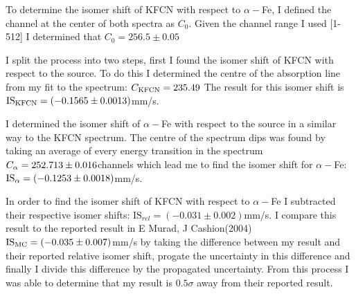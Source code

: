 \documentclass[a4paper, twocolumn]{article}
\begin{document}
To determine the isomer shift of KFCN with respect to $\alpha-$Fe, I defined the channel at the center of both spectra as $C_0$. Given the channel range I used [1-512] I determined that $C_0 = 256.5\pm0.05$

I split the process into two steps, first I found the isomer shift of KFCN with respect to the source.
To do this I determined the centre of the absorption line from my fit to the spectrum: $C_{\rm KFCN} = 235.49$ The result for this isomer shift is $\textrm{IS}_{\rm KFCN} = (-0.1565\pm0.0013)$mm/s.

I determined the isomer shift of $\alpha-$Fe with respect to the source in a similar way to the KFCN spectrum. 
The centre of the spectrum dips was found by taking an average of every energy transition in the spectrum $C_{\rm \alpha} = 252.713\pm0.016$channels which lead me to find the isomer shift for $\alpha-$Fe: $\textrm{IS}_{\rm \alpha} = (-0.1253\pm0.0018)$mm/s.

In order to find the isomer shift of KFCN with respect to $\alpha-$Fe I subtracted their respective isomer shifts:
$\textrm{IS}_{rel} = (-0.031\pm0.002)$mm/s. I compare this result to the reported result in E Murad, J Cashion(2004) $\textrm{IS}_{\rm MC} = (-0.035\pm0.007)$mm/s by taking the difference between my result and their reported relative isomer shift, progate the uncertainty in this difference and finally I divide this difference by the propagated uncertainty.
From this process I was able to determine that my result is $0.5\sigma$ away from their reported result.
\end{document}

